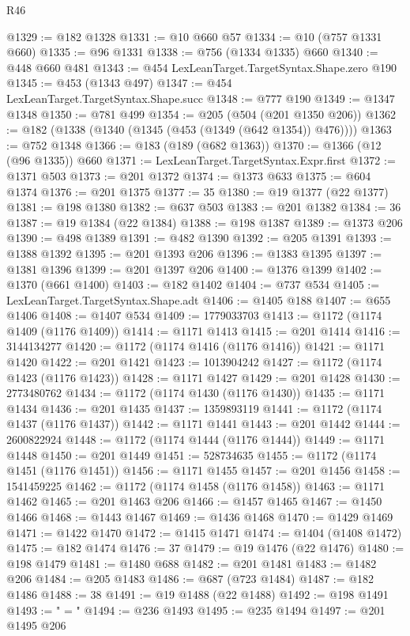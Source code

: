 \begin{lexlean}{R46}
\begin{coremodule}
@1329 := @182 @1328
@1331 := @10 @660 @57
@1334 := @10 (@757 @1331 @660)
@1335 := @96 @1331
@1338 := @756 (@1334 @1335) @660
@1340 := @448 @660 @481
@1343 := @454 LexLeanTarget.TargetSyntax.Shape.zero @190
@1345 := @453 (@1343 @497)
@1347 := @454 LexLeanTarget.TargetSyntax.Shape.succ
@1348 := @777 @190
@1349 := @1347 @1348
@1350 := @781 @499
@1354 := @205 (@504 (@201 @1350 @206))
@1362 := @182 (@1338 (@1340 (@1345 (@453 (@1349 (@642 @1354)) @476))))
@1363 := @752 @1348
@1366 := @183 (@189 (@682 @1363))
@1370 := @1366 (@12 (@96 @1335)) @660
@1371 := LexLeanTarget.TargetSyntax.Expr.first
@1372 := @1371 @503
@1373 := @201 @1372
@1374 := @1373 @633
@1375 := @604 @1374
@1376 := @201 @1375
@1377 := 35
@1380 := @19 @1377 (@22 @1377)
@1381 := @198 @1380
@1382 := @637 @503
@1383 := @201 @1382
@1384 := 36
@1387 := @19 @1384 (@22 @1384)
@1388 := @198 @1387
@1389 := @1373 @206
@1390 := @498 @1389
@1391 := @482 @1390
@1392 := @205 @1391
@1393 := @1388 @1392
@1395 := @201 @1393 @206
@1396 := @1383 @1395
@1397 := @1381 @1396
@1399 := @201 @1397 @206
@1400 := @1376 @1399
@1402 := @1370 (@661 @1400)
@1403 := @182 @1402
@1404 := @737 @534
@1405 := LexLeanTarget.TargetSyntax.Shape.adt
@1406 := @1405 @188
@1407 := @655 @1406
@1408 := @1407 @534
@1409 := 1779033703
@1413 := @1172 (@1174 @1409 (@1176 @1409))
@1414 := @1171 @1413
@1415 := @201 @1414
@1416 := 3144134277
@1420 := @1172 (@1174 @1416 (@1176 @1416))
@1421 := @1171 @1420
@1422 := @201 @1421
@1423 := 1013904242
@1427 := @1172 (@1174 @1423 (@1176 @1423))
@1428 := @1171 @1427
@1429 := @201 @1428
@1430 := 2773480762
@1434 := @1172 (@1174 @1430 (@1176 @1430))
@1435 := @1171 @1434
@1436 := @201 @1435
@1437 := 1359893119
@1441 := @1172 (@1174 @1437 (@1176 @1437))
@1442 := @1171 @1441
@1443 := @201 @1442
@1444 := 2600822924
@1448 := @1172 (@1174 @1444 (@1176 @1444))
@1449 := @1171 @1448
@1450 := @201 @1449
@1451 := 528734635
@1455 := @1172 (@1174 @1451 (@1176 @1451))
@1456 := @1171 @1455
@1457 := @201 @1456
@1458 := 1541459225
@1462 := @1172 (@1174 @1458 (@1176 @1458))
@1463 := @1171 @1462
@1465 := @201 @1463 @206
@1466 := @1457 @1465
@1467 := @1450 @1466
@1468 := @1443 @1467
@1469 := @1436 @1468
@1470 := @1429 @1469
@1471 := @1422 @1470
@1472 := @1415 @1471
@1474 := @1404 (@1408 @1472)
@1475 := @182 @1474
@1476 := 37
@1479 := @19 @1476 (@22 @1476)
@1480 := @198 @1479
@1481 := @1480 @688
@1482 := @201 @1481
@1483 := @1482 @206
@1484 := @205 @1483
@1486 := @687 (@723 @1484)
@1487 := @182 @1486
@1488 := 38
@1491 := @19 @1488 (@22 @1488)
@1492 := @198 @1491
@1493 := " = "
@1494 := @236 @1493
@1495 := @235 @1494
@1497 := @201 @1495 @206

\end{coremodule}
\end{lexlean}
